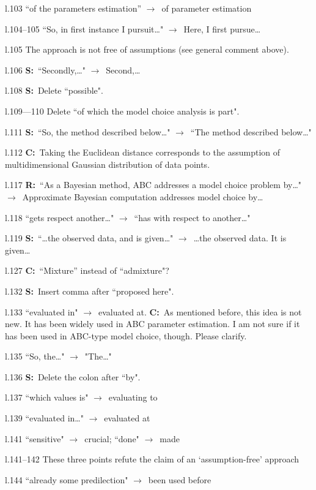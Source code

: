 \documentclass[11pt]{article}
\newenvironment{my_description}
{\begin{description}
  \setlength{\itemsep}{2pt}
  \setlength{\parskip}{0pt}
  \setlength{\parsep}{0pt}}
{\end{description}}
\newcommand{\ra}{$\rightarrow$\ }
\newcommand{\C}{\textbf{C:}\ }
\newcommand{\R}{\textbf{R:}\ }
\newcommand{\V}{\textbf{S:}\ }
\begin{document}
\begin{my_description}
	\item[l.103] ``of the parameters estimation'' \ra of parameter estimation
	\item[l.104--105] ``So, in first instance I pursuit\dots" \ra Here, I first pursue\dots
	\item[l.105] The approach is not free of assumptions (see general comment above).
	\item[l.106] \V ``Secondly,\dots" \ra Second,\dots
	\item[l.108] \V Delete ``possible".
	\item[l.109---110] Delete ``of which the model choice analysis is part".
	\item[l.111] \V ``So, the method described below\dots" \ra ``The method described below\dots"
	\item[l.112] \C Taking the Euclidean distance corresponds to the assumption of multidimensional Gaussian distribution of data points.
	\item[l.117] \R ``As a Bayesian method, ABC addresses a model choice problem by\dots" \ra Approximate Bayesian computation addresses model choice by\dots
	\item[l.118] ``gets respect another\dots" \ra ``has with respect to another\dots"
	\item[l.119] \V ``\dots the observed data, and is given\dots" \ra \dots the observed data. It is given\dots
	\item[l.127] \C ``Mixture'' instead of ``admixture"?
	\item[l.132] \V Insert comma after ``proposed here".
	\item[l.133] ``evaluated in" \ra evaluated at. \C As mentioned before, this idea is not new. It has been widely used in ABC parameter estimation. I am not sure if it has been used in ABC-type model choice, though. Please clarify.
	\item[l.135] ``So, the\dots" \ra "The\dots"
	\item[l.136] \V Delete the colon after ``by".
	\item[l.137] ``which values is" \ra evaluating to
	\item[l.139] ``evaluated in\dots" \ra evaluated at
	\item[l.141] ``sensitive" \ra crucial; ``done" \ra made
	\item[l.141--142] These three points refute the claim of an `assumption-free' approach
	\item[l.144] ``already some predilection" \ra been used before

\end{my_description}
\end{document}
